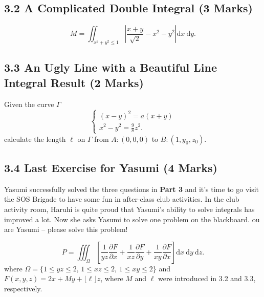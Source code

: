 \documentclass[12pt]{article}
\begin{document}
\subsection*{3.2 A Complicated Double Integral (3 Marks)}
\begin{equation*}
    M=\iint_{x^{2}+y^{2} \leqslant 1}\left|\frac{x+y}{\sqrt{2}}-x^{2}-y^{2}\right| \mathrm{d} x \mathrm{~d} y.
\end{equation*}

\subsection*{3.3 An Ugly Line with a Beautiful Line Integral Result (2 Marks)}
Given the curve $\varGamma$
\begin{equation*}
    \left\{\begin{array}{l}
(x-y)^{2}=a(x+y) \\
x^{2}-y^{2}=\frac{9}{8} z^{2}. 
\end{array}\right.
\end{equation*}
calculate the length $\ell$ on $\varGamma$ from $A\colon\left(0, 0, 0\right)$ to $B\colon\left(1, y_0, z_0\right)$. 

\subsection*{3.4 Last Exercise for Yasumi (4 Marks)}

Yasumi successfully solved the three questions in \textbf{Part 3} and it's time to go visit the SOS Brigade to have some fun in after-class club activities. In the club activity room, Haruhi is quite proud that Yasumi's ability to solve integrals has improved a lot. Now she asks Yasumi to solve one problem on the blackboard. ou are Yasumi -- please solve this problem!

\begin{equation*}
    P=\iiint_{\varOmega}\left[\frac{1}{y z} \frac{\partial F}{\partial x}+\frac{1}{x z} \frac{\partial F}{\partial y}+\frac{1}{x y} \frac{\partial F}{\partial x}\right] \mathrm{d} x \mathrm{~d} y \mathrm{~d} z. 
\end{equation*}
where $\varOmega=\{ 1 \leqslant y z \leqslant 2$, $1 \leqslant x z \leqslant 2$, $1 \leqslant x y \leqslant 2\}$ and $F(x,y,z)=2 x + M y + \lfloor \ell \rfloor z$, where $M$ and $\ell$ were introduced in 3.2 and 3.3, respectively.
\end{document}
